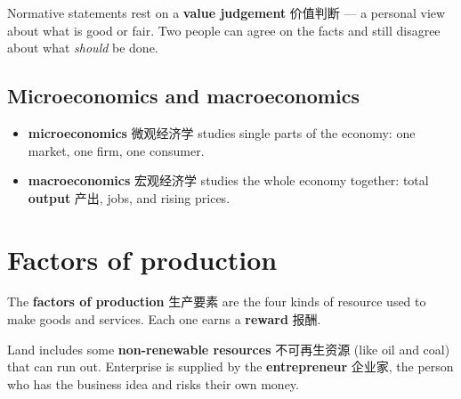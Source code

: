 \documentclass[11pt]{article}
\begin{document}
Normative statements rest on a \textbf{value judgement} 价值判断 — a personal view about what is good or fair. Two people can agree on the facts and still disagree about what \emph{should} be done.

\subsection*{Microeconomics and macroeconomics}

\begin{itemize}
\item \textbf{microeconomics} 微观经济学 studies single parts of the economy: one market, one firm, one consumer.

\item \textbf{macroeconomics} 宏观经济学 studies the whole economy together: total \textbf{output} 产出, jobs, and rising prices.

\end{itemize}

\section*{Factors of production}

The \textbf{factors of production} 生产要素 are the four kinds of resource used to make goods and services. Each one earns a \textbf{reward} 报酬.

\begin{center}
\end{center}

Land includes some \textbf{non-renewable resources} 不可再生资源 (like oil and coal) that can run out. Enterprise is supplied by the \textbf{entrepreneur} 企业家, the person who has the business idea and risks their own money.
\end{document}
